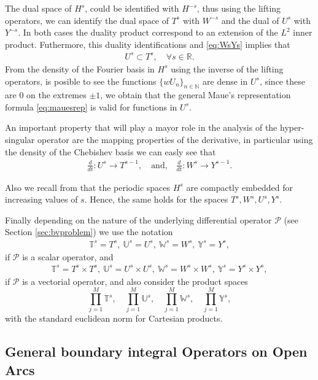 \documentclass{article}
\newcommand{\IN}{{\mathbb N}}
\newcommand{\IR}{{\mathbb R}}
\newcommand{\IU}{{\mathbb U}}
\newcommand{\IT}{{\mathbb T}}
\newcommand{\IW}{{\mathbb W}}
\newcommand{\IY}{{\mathbb Y}}
\newcommand{\cP}{\mathcal{P}}
\begin{document}
The dual space of $H^s$, could be identified with $H^{-s}$, thus using the lifting operators, we can identify the dual space of $T^s$ with $W^{-s}$ and the dual of $U^s$ with $Y^{-s}$. In both cases the duality product correspond to an extension of the $L^2$ inner product. Futhermore, this duality identifications and \eqref{eq:WsYs} implies that 
\begin{align}
\label{eq:UsTs}
U^s \subset T^s, \quad \forall s \in \IR.
\end{align}
From the density of the Fourier basis in $H^s$ using the inverse of the lifting operators, is posible to see the functions $\{wU_n\}_{n \in \IN}$ are dense in $U^s$, since these are $0$
on the extremes $\pm 1$, we obtain that the general Maue's representation formula \eqref{eq:mauesrep} is valid for functions in $U^s$.  


An important property that will play a mayor role in the analysis of the hyper-singular operator are the mapping properties of the derivative, in particular using the density of the Chebishev basis we can easly see that 
\begin{align}
\label{eq:devprop}
\frac{d}{dt} : U^s \rightarrow T^{s-1}, \quad \text{and,} \quad 
\frac{d}{dt} : W^s \rightarrow Y^{s-1}.
\end{align}

Also we recall from \cite[Lemma 5.3.2]{saranen2013periodic} that the periodic spaces $H^s$ are compactly embedded for increasing values of $s$. Hence, the same holds for the spaces $T^s,W^s,U^s,Y^s$.

Finally depending on the nature of the underlying differential operator $\cP$ (see Section \ref{sec:bvproblem}) we use the notation 
\begin{align*}
\IT^s = T^s,\ \IU^s = U^s, \ \IW^s = W^s, \ \IY^s = Y^s,
\end{align*}
if $\cP$ is a scalar operator, and 
\begin{align*}
\IT^s = T^s \times T^s,\ \IU^s = U^s \times U^s, \ \IW^s = W^s \times W^s, \ \IY^s = Y^s \times Y^s,
\end{align*}
if $\cP$ is a vectorial operator, and also consider the product spaces 
$$
\prod_{j=1}^M \IT^s, \quad \prod_{j=1}^M \IU^s,  \quad \prod_{j=1}^M \IW^s, \quad \prod_{j=1}^M \IY^s,
$$
with the standard euclidean norm for Cartesian products.
\subsection{General boundary integral Operators on Open Arcs}
\label{sec:generalbio}
\end{document}
